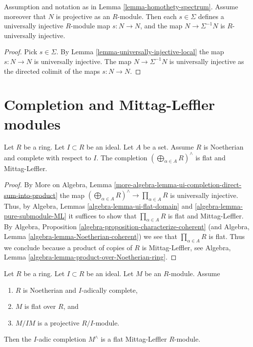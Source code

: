 \begin{lemma}
\label{lemma-invert-universally-injective}
Assumption and notation as in
Lemma \ref{lemma-homothety-spectrum}.
Assume moreover that $N$ is projective as an $R$-module.
Then each $s \in \Sigma$ defines a
universally injective $R$-module map $s : N \to N$, and the
map $N \to \Sigma^{-1}N$ is $R$-universally injective.
\end{lemma}

\begin{proof}
Pick $s \in \Sigma$. By
Lemma \ref{lemma-universally-injective-local}
the map $s : N \to N$ is universally injective.
The map $N \to \Sigma^{-1}N$ is universally injective as the directed
colimit of the maps $s : N \to N$.
\end{proof}






\section{Completion and Mittag-Leffler modules}
\label{section-completion-ML}


\begin{lemma}
\label{lemma-completed-direct-sum-ML}
Let $R$ be a ring. Let $I \subset R$ be an ideal. Let $A$ be a set.
Assume $R$ is Noetherian and complete with respect to $I$. The completion
$(\bigoplus\nolimits_{\alpha \in A} R)^\wedge$
is flat and Mittag-Leffler.
\end{lemma}

\begin{proof}
By
More on Algebra, Lemma
\ref{more-algebra-lemma-ui-completion-direct-sum-into-product}
the map $(\bigoplus\nolimits_{\alpha \in A} R)^\wedge
\to \prod_{\alpha \in A} R$ is universally injective.
Thus, by
Algebra, Lemmas \ref{algebra-lemma-ui-flat-domain} and
\ref{algebra-lemma-pure-submodule-ML}
it suffices to show that $\prod_{\alpha \in A} R$ is flat and Mittag-Leffler.
By
Algebra, Proposition \ref{algebra-proposition-characterize-coherent}
(and
Algebra, Lemma \ref{algebra-lemma-Noetherian-coherent})
we see that $\prod_{\alpha \in A} R$ is flat.
Thus we conclude because a product of copies of $R$ is Mittag-Leffler, see
Algebra, Lemma \ref{algebra-lemma-product-over-Noetherian-ring}.
\end{proof}

\begin{lemma}
\label{lemma-lift-ML}
Let $R$ be a ring. Let $I \subset R$ be an ideal.
Let $M$ be an $R$-module.
Assume
\begin{enumerate}
\item $R$ is Noetherian and $I$-adically complete,
\item $M$ is flat over $R$, and
\item $M/IM$ is a projective $R/I$-module.
\end{enumerate}
Then the $I$-adic completion $M^\wedge$ is a flat Mittag-Leffler
$R$-module.
\end{lemma}

